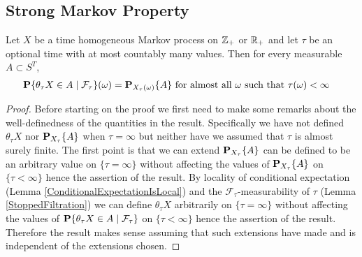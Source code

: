 \subsection{Strong Markov Property}

\begin{lem}Let $X$ be a time homogeneous Markov process on
  $\integers_+$ or $\reals_+$ and let $\tau$ be an optional
  time with at most countably many values.  Then for every measurable
  $A \subset S^T$,
\begin{align*}
\cprobability{\mathcal{F}_\tau}{\theta_\tau X \in A}(\omega) &=
\sprobability{A}{X_\tau(\omega)} \text{ for almost all $\omega$ such that $\tau(\omega) < \infty$}
\end{align*}
\end{lem}
\begin{proof}
Before starting on the proof we first need to make some remarks about
the well-definedness of the quantities in the result.  Specifically we
have not defined $\theta_\tau X$ nor $\sprobability{A}{X_\tau}$ when $\tau = \infty$ but neither have
we assumed that $\tau$ is almost surely finite.  The first point is that we
can extend $\sprobability{A}{X_\tau}$ can be defined to be an
arbitrary value on $\lbrace \tau = \infty \rbrace$ without affecting
the values of $\sprobability{A}{X_\tau}$ on $\lbrace \tau < \infty
\rbrace$ hence the assertion of the result.  By locality of
conditional expectation (Lemma \ref{ConditionalExpectationIsLocal})
and the $\mathcal{F}_\tau$-measurability of
$\tau$ (Lemma
\ref{StoppedFiltration}) we can define $\theta_\tau X$ arbitrarily on $\lbrace \tau =
\infty \rbrace$ without affecting the values of
$\cprobability{\mathcal{F}_\tau}{\theta_\tau X \in A}$ on $\lbrace \tau < \infty
\rbrace$ hence the assertion of the result.  Therefore the result
makes sense assuming that such extensions have made and is independent
of the extensions chosen.


\end{proof}
